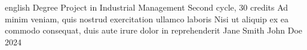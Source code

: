 

\makecoverfront
    {english}
    {Degree Project in Industrial Management}
    {Second cycle, 30 credits}
    {Ad minim veniam, quis nostrud exercitation ullamco laboris}
    {Nisi ut aliquip ex ea commodo consequat, duis aute irure dolor in reprehenderit}
    {Jane Smith}
    {John Doe}
    {2024}